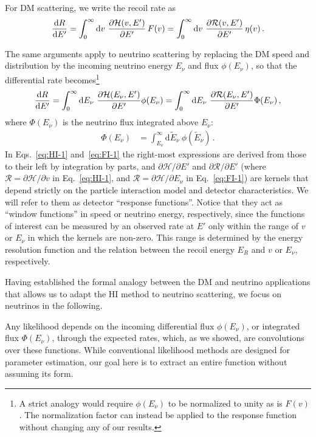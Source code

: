 \documentclass[a4paper,11pt]{article}
\renewcommand\({\left(}
\renewcommand\){\right)}
\renewcommand\[{\left[}
\renewcommand\]{\right]}
\newcommand{\df}{\text{d}}
\newcommand{\al}[1]{\begin{align}#1\end{align}}
\newcommand{\paren}[1]{\left(#1\right)}
\newcommand{\fn}[1]{\!\paren{#1}} %
\newcommand{\nn}{\nonumber\\}
\newcommand{\p}{\partial}
\theoremstyle{definition}
\newcommand{\ov}{\over}
\begin{document}
For DM scattering, we write the recoil rate as
\al{
    {\df R\ov \df E'} = \int_0^\infty 
    \df v~ {\p \mathcal{H} (v, E')\ov \p E'}
    \, {F(v)} = \int_0^\infty 
    \df v~ {\p \mathcal{R} (v, E')\ov \p E'}
    \, {\eta(v)}\,.
\label{eq:HI-1}
}

The same arguments apply to neutrino scattering by replacing the DM speed and distribution by the incoming neutrino energy $E_\nu$ and flux $\phi(E_\nu)$, so that the differential rate becomes\footnote{A strict analogy would require $\phi(E_\nu)$ to be normalized to unity as is $F(v)$. The normalization factor can instead be applied to the response function without changing any of our results.}
\al{
    {\df R\ov \df E'} = \int_0^\infty 
    \df E_\nu~ {\p \mathcal{H}(E_\nu, E')\ov \p E'}{\phi(E_\nu)} %
    = \int_0^\infty 
    \df E_\nu~ {\p \mathcal{R}(E_\nu, E')\ov \p E'} {\Phi(E_\nu)} \,,
\label{eq:FI-1}
}
where $\Phi\fn{E_{\nu}}$ is the  neutrino flux integrated above $E_\nu$:
\al{
    \Phi\fn{E_{\nu}} &= \int_{E_\nu}^\infty\df \tilde{E}_\nu~ \phi\fn{\tilde{E}_{\nu}}\,.
    \label{integrated-nu-flux}
}
In Eqs.~\eqref{eq:HI-1} 
and~\eqref{eq:FI-1} the right-most expressions are derived from those to their left by integration by parts, and $\p \mathcal{H}/\p E'$ and $\p \mathcal{R}/ \p E'$ (where $\mathcal{R}=\partial \mathcal{H}/\partial v$ in Eq.~\ref{eq:HI-1},  and  
 $\mathcal{R}=\partial \mathcal{H}/\partial E_\nu$ in Eq.~\ref{eq:FI-1}) are kernels that depend strictly on the particle interaction model and detector characteristics. We will refer to them as detector ``response functions''.  Notice that they act as ``window functions'' in speed or neutrino energy, respectively,  since  the functions of interest  can be measured by an observed rate at $E'$ only within the range of $v$ or $E_\nu$ in which the kernels are non-zero. This range is determined by the energy resolution function and the relation between the recoil energy $E_R$ and $v$ or $E_\nu$, respectively.  

Having established the formal analogy between the DM and neutrino applications that allows us to adapt the HI method to neutrino scattering, we focus on neutrinos in the following. 

Any likelihood
 depends on the incoming differential flux ${\phi(E_\nu)}$, or integrated flux ${\Phi(E_\nu)}$,   
 through the expected rates, which, as we showed, are convolutions over these functions.    While conventional likelihood methods are designed for parameter estimation, our goal here is to extract an entire function without assuming its form.
 
\end{document}
